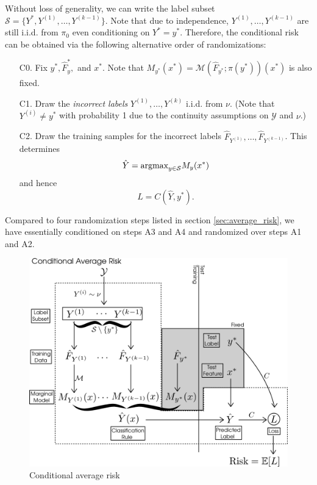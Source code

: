 \documentclass[12pt]{article}
\begin{document}
Without loss of generality, we can write the label subset $\mathcal{S}
= \{Y^*, Y^{(1)},\hdots, Y^{(k-1)}\}$.  Note that due to independence,
$Y^{(1)},\hdots, Y^{(k-1)}$ are still i.i.d. from $\pi_0$ even
conditioning on $Y^* = y^*.$ Therefore, the conditional risk can be
obtained via the following alternative order of randomizations:
\begin{enumerate}
\item[C0.] 
Fix $y^*, \hat{F}_y^*,$ and $x^*$.  Note that $M_{y^*}(x^*)
= \mathcal{M}(\hat{F}_{y^*}; \pi(y^*))(x^*)$ is also fixed.
\item[C1.]
Draw the \emph{incorrect labels} $Y^{(1)},\hdots, Y^{(k)}$ i.i.d. from
$\nu$.  (Note that $Y^{(i)} \neq y^*$ with probability 1 due to the
continuity assumptions on $\mathcal{Y}$ and $\nu$.)
\item[C2.]
Draw the training samples for the incorrect labels
$\hat{F}_{Y^{(1)}},\hdots, \hat{F}_{Y^{(k-1)}}$.  This determines
\[
\hat{Y} = \text{argmax}_{y \in \mathcal{S}} M_y(x^*)
\]
and hence
\[
L = C(\hat{Y}, y^*).
\]
\end{enumerate}
Compared to four randomization steps listed in
section \ref{sec:average_risk}, we have essentially conditioned on
steps A3 and A4 and randomized over steps A1 and A2.


\begin{figure}[h]
\centering
\includegraphics[scale = 0.3]{extrapolation_figures/conditional_risk.png}
\caption{Conditional average risk}\label{fig:conditional_risk}
\end{figure}
\end{document}
